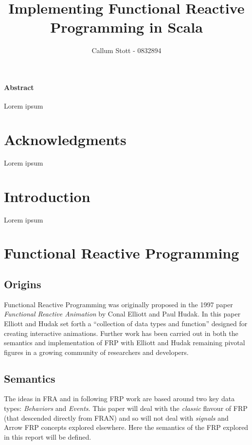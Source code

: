 \documentclass[12pt]{article}
\title{Implementing Functional Reactive Programming in Scala}
\author{Callum Stott - 0832894}
\begin{document}
  \maketitle
  \paragraph*{Abstract}
  Lorem ipsum
  
  \newpage
  \section*{Acknowledgments}
    Lorem ipsum
  
  \newpage
  \tableofcontents
  
  \newpage
  
  \section{Introduction}
  Lorem ipsum
  \section{Functional Reactive Programming}
    \subsection{Origins}
      Functional Reactive Programming was originally proposed in the 1997 paper \emph{Functional
      Reactive Animation} by Conal Elliott and Paul Hudak. In this paper Elliott and Hudak
      set forth a ``collection of data types and function'' designed for creating interactive 
      animations. Further work has been carried out in both the semantics and implementation
      of FRP with Elliott and Hudak remaining pivotal figures in a growing community of researchers
      and developers.
      
    \subsection{Semantics}
      The ideas in FRA and in following FRP work are based around two key data types: 
      \emph{Behaviors} and \emph{Events}. This paper will deal with the \emph{classic} flavour of
      FRP (that descended directly from FRAN) and so will not deal with \emph{signals} and Arrow FRP
      concepts explored elsewhere. Here the semantics of the FRP explored in this report will be defined.
    
\end{document}

